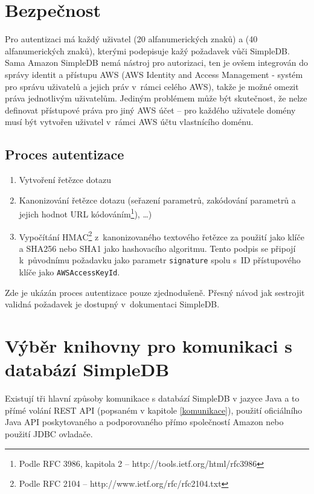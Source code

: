 \documentclass[oneside,12pt]{fithesis2}
\begin{document}
\section{Bezpečnost}
Pro autentizaci má každý uživatel  (20 alfanumerických znaků) a  (40 alfanumerických znaků), kterými podepisuje kažý požadavek vůči SimpleDB. Sama Amazon SimpleDB nemá nástroj pro autorizaci, ten je ovšem integrován do správy identit a přístupu AWS (AWS Identity and Access Management - systém pro správu uživatelů a jejich práv v~rámci celého AWS), takže je možné omezit práva jednotlivým uživatelům. Jediným problémem může být skutečnost, že nelze definovat přístupové práva pro jiný AWS účet -- pro každého uživatele domény musí být vytvořen uživatel v~rámci AWS účtu vlastnícího doménu.

\subsection{Proces autentizace}
\begin{enumerate}
 \item Vytvoření řetězce dotazu
 \item Kanonizování řetězce dotazu (seřazení parametrů, zakódování parametrů a jejich hodnot URL kódováním\footnote{Podle RFC 3986, kapitola 2 -- http://tools.ietf.org/html/rfc3986}), \dots)
 \item Vypočítání HMAC\footnote{Podle RFC 2104 -- http://www.ietf.org/rfc/rfc2104.txt} z~kanonizovaného textového řetězce za použití  jako klíče a SHA256 nebo SHA1 jako hashovacího algoritmu. Tento podpis se připojí k~původnímu požadavku jako parametr \verb<signature< spolu s~ID přístupového klíče jako \verb<AWSAccessKeyId<.
\end{enumerate}
Zde je ukázán proces autentizace pouze zjednodušeně. Přesný návod jak sestrojit validná požadavek je dostupný v~dokumentaci SimpleDB.

\section{Výběr knihovny pro komunikaci s databází SimpleDB}
Existují tři hlavní způsoby komunikace s databází SimpleDB v jazyce Java a to přímé volání REST API (popsaném v kapitole \ref{komunikace}), použití oficiálního Java API poskytovaného a podporovaného přímo společností Amazon nebo použití JDBC ovladače.
\end{document}

